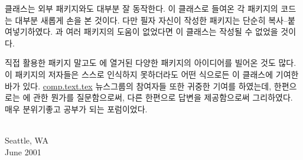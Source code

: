 %
 클래스는 외부 패키지와도 대부분 잘 동작한다. 이 클래스로 들여온 각 패키지의 코드는 대부분 새롭게 손을 본 것이다.
다만 필자 자신이 작성한 패키지는 단순히 복사--붙여넣기하였다. 
\ltx 과 여러 패키지의 도움이 없었다면 이 클래스는 작성될 수 없었을 것이다.


%
%
직접 활용한 패키지 말고도 \bibname 에 열거된 다양한 패키지의 아이디어를 빌어온 것도 많다.
이 패키지의 저자들은 스스로 인식하지 못하더라도 어떤 식으로든 이 클래스에 기여한 바가 있다.
\url{comp.text.tex} 뉴스그룹의 참여자들 또한 귀중한 기여를 하였는데,
한편으로는 \ltx 에 관한 뭔가를 질문함으로써, 다른 한편으로 답변을 제공함으로써 그리하였다.
매우 분위기좋고 공부가 되는 포럼이었다.


{ \\ Seattle, WA \\ June 2001\par}


